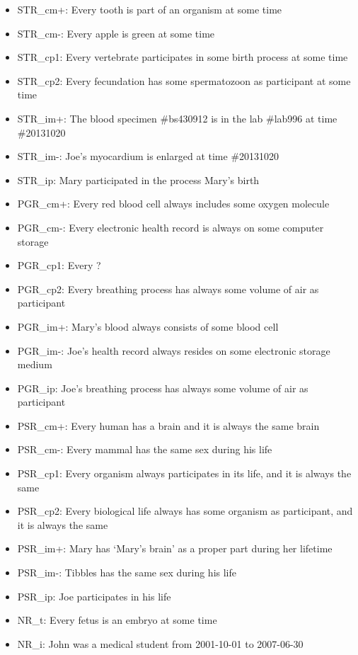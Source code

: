 \begin{itemize}
\item STR\_cm+: Every tooth is part of an organism at some time
\item STR\_cm-: Every apple is green at some time
\item STR\_cp1: Every vertebrate participates in some birth process at some time
\item STR\_cp2: Every fecundation has some spermatozoon as participant at some time
\item STR\_im+: The blood specimen \#bs430912 is in the lab \#lab996 at time \#20131020
\item STR\_im-: Joe's myocardium is enlarged at time \#20131020
\item STR\_ip:  Mary participated in the process Mary's birth

\item PGR\_cm+: Every red blood cell always includes some oxygen molecule 
\item PGR\_cm-: Every electronic health record is always on some computer storage
\item PGR\_cp1: Every ?  
\item PGR\_cp2: Every breathing process has always some volume of air as participant 
\item PGR\_im+: Mary's blood always consists of some blood cell 
\item PGR\_im-: Joe's health record always resides on some electronic storage medium
\item PGR\_ip:  Joe's breathing process has always some volume of air as participant

\item PSR\_cm+: Every human has a brain and it is always the same brain
\item PSR\_cm-: Every mammal has the same sex during his life 
\item PSR\_cp1: Every organism always participates in its life, and it is always the same
\item PSR\_cp2: Every biological life always has some organism as participant, and it is always the same
\item PSR\_im+: Mary has `Mary's brain' as a proper part during her lifetime 
\item PSR\_im-: Tibbles has the same sex during his life 
\item PSR\_ip: Joe participates in his life

\item NR\_t: Every fetus is an embryo at some time
\item NR\_i: John was a medical student from 2001-10-01 to 2007-06-30


\end{itemize}
